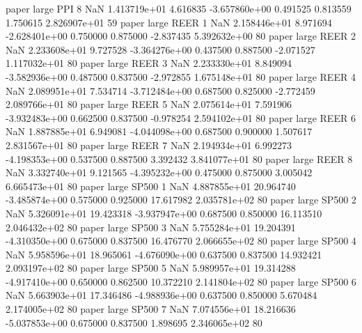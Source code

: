             paper      large      PPI                 8                  NaN 1.413719e+01      4.616835 -3.657860e+00 0.491525 0.813559       1.750615 2.826907e+01 59
            paper      large     REER                 1                  NaN 2.158446e+01      8.971694 -2.628401e+00 0.750000 0.875000      -2.837435 5.392632e+00 80
            paper      large     REER                 2                  NaN 2.233608e+01      9.727528 -3.364276e+00 0.437500 0.887500      -2.071527 1.117032e+01 80
            paper      large     REER                 3                  NaN 2.233330e+01      8.849094 -3.582936e+00 0.487500 0.837500      -2.972855 1.675148e+01 80
            paper      large     REER                 4                  NaN 2.089951e+01      7.534714 -3.712484e+00 0.687500 0.825000      -2.772459 2.089766e+01 80
            paper      large     REER                 5                  NaN 2.075614e+01      7.591906 -3.932483e+00 0.662500 0.837500      -0.978254 2.594102e+01 80
            paper      large     REER                 6                  NaN 1.887885e+01      6.949081 -4.044098e+00 0.687500 0.900000       1.507617 2.831567e+01 80
            paper      large     REER                 7                  NaN 2.194934e+01      6.992273 -4.198353e+00 0.537500 0.887500       3.392432 3.841077e+01 80
            paper      large     REER                 8                  NaN 3.332740e+01      9.121565 -4.395232e+00 0.475000 0.875000       3.005042 6.665473e+01 80
            paper      large    SP500                 1                  NaN 4.887855e+01     20.964740 -3.485874e+00 0.575000 0.925000      17.617982 2.035781e+02 80
            paper      large    SP500                 2                  NaN 5.326091e+01     19.423318 -3.937947e+00 0.687500 0.850000      16.113510 2.046432e+02 80
            paper      large    SP500                 3                  NaN 5.755284e+01     19.204391 -4.310350e+00 0.675000 0.837500      16.476770 2.066655e+02 80
            paper      large    SP500                 4                  NaN 5.958596e+01     18.965061 -4.676090e+00 0.637500 0.837500      14.932421 2.093197e+02 80
            paper      large    SP500                 5                  NaN 5.989957e+01     19.314288 -4.917410e+00 0.650000 0.862500      10.372210 2.141804e+02 80
            paper      large    SP500                 6                  NaN 5.663903e+01     17.346486 -4.988936e+00 0.637500 0.850000       5.670484 2.174005e+02 80
            paper      large    SP500                 7                  NaN 7.074556e+01     18.216636 -5.037853e+00 0.675000 0.837500       1.898695 2.346065e+02 80

